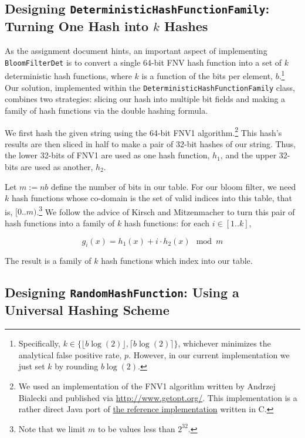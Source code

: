 \documentclass{article}
\begin{document}
\subsection{Designing \texttt{DeterministicHashFunctionFamily}: Turning One
            Hash into $k$ Hashes}

As the assignment document hints, an important aspect of implementing
\texttt{BloomFilterDet} is to convert a single 64-bit FNV hash function into a
set of $k$ deterministic hash functions, where $k$ is a function of the bits
per element, $b$.\footnote{
  Specifically, $k \in \{ \lfloor b \log(2) \rfloor, \lceil b \log(2) \rceil\}$,
  whichever minimizes the analytical false positive rate, $p$. However, in our
  current implementation we just set $k$ by rounding $b \log(2)$.
} Our solution, implemented within the \texttt{DeterministicHashFunctionFamily}
class, combines two strategies: slicing our hash into multiple bit fields and
making a family of hash functions via the double hashing formula.

We first hash the given string using the 64-bit FNV1 algorithm.\footnote{
  We used an implementation of the FNV1 algorithm written by Andrzej Bialecki
  and published via \url{http://www.getopt.org/}. This implementation is a
  rather direct Java port of \href{http://isthe.com/chongo/tech/comp/fnv/}{the
  reference implementation} written in C.
} This hash's results are then sliced in half to make a pair of 32-bit hashes
of our string. Thus, the lower 32-bits of FNV1 are used as one hash function,
$h_1$, and the upper 32-bits are used as another, $h_2$.

Let $m := nb$ define the number of bits in our table. For our bloom filter, we
need $k$ hash functions whose co-domain is the set of valid indices into this
table, that is, $[0..m)$.\footnote{Note that we limit $m$ to be values less than
$2^{32}$.} We follow the advice of Kirsch and Mitzenmacher \cite{kirsch2006less}
to turn this pair of hash functions into a family of $k$ hash functions: for
each $i \in [1..k]$,

$$g_i(x) = h_1(x) + i \cdot h_2(x) \mod m$$

The result is a family of $k$ hash functions which index into our table.


\subsection{Designing \texttt{RandomHashFunction}: Using a Universal Hashing Scheme}
\end{document}
